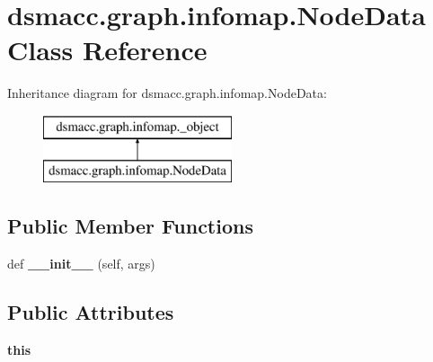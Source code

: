 \hypertarget{classdsmacc_1_1graph_1_1infomap_1_1NodeData}{}\section{dsmacc.\+graph.\+infomap.\+Node\+Data Class Reference}
\label{classdsmacc_1_1graph_1_1infomap_1_1NodeData}
Inheritance diagram for dsmacc.\+graph.\+infomap.\+Node\+Data\+:\begin{figure}[H]
\begin{center}
\leavevmode
\includegraphics[height=2.000000cm]{classdsmacc_1_1graph_1_1infomap_1_1NodeData}
\end{center}
\end{figure}
\subsection*{Public Member Functions}
\begin{DoxyCompactItemize}
\item 
\mbox{\label{classdsmacc_1_1graph_1_1infomap_1_1NodeData_a832bcb4e2571162deb89aa65668ab488}} 
def {\bfseries \+\_\+\+\_\+init\+\_\+\+\_\+} (self, args)
\end{DoxyCompactItemize}
\subsection*{Public Attributes}
\begin{DoxyCompactItemize}
\item 
\mbox{\label{classdsmacc_1_1graph_1_1infomap_1_1NodeData_a65f6be714fbdf11393bcf62ffa6af939}} 
{\bfseries this}
\end{DoxyCompactItemize}
